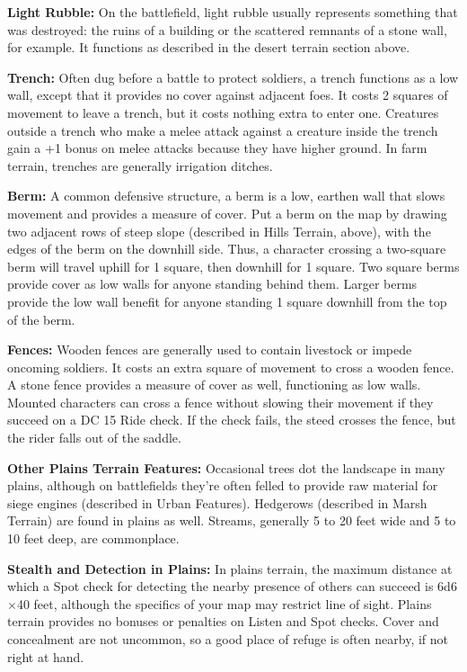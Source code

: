 \documentclass{article}
\begin{document}
\textbf{Light Rubble:} On the battlefield, light rubble usually represents something 
that was destroyed: the ruins of a building or the scattered remnants of a stone 
wall, for example. It functions as described in the desert terrain section above.

\textbf{Trench:} Often dug before a battle to protect soldiers, a trench functions 
as a low wall, except that it provides no cover against adjacent foes. It costs 
2 squares of movement to leave a trench, but it costs nothing extra to enter one. 
Creatures outside a trench who make a melee attack against a creature inside the 
trench gain a +1 bonus on melee attacks because they have higher ground. In farm 
terrain, trenches are generally irrigation ditches.

\textbf{Berm: }A common defensive structure, a berm is a low, earthen wall that 
slows movement and provides a measure of cover. Put a berm on the map by drawing 
two adjacent rows of steep slope (described in Hills Terrain, above), with the 
edges of the berm on the downhill side. Thus, a character crossing a two-square 
berm will travel uphill for 1 square, then downhill for 1 square. Two square berms 
provide cover as low walls for anyone standing behind them. Larger berms provide 
the low wall benefit for anyone standing 1 square downhill from the top of the 
berm. 

\textbf{Fences:} Wooden fences are generally used to contain livestock or impede 
oncoming soldiers. It costs an extra square of movement to cross a wooden fence. 
A stone fence provides a measure of cover as well, functioning as low walls. Mounted 
characters can cross a fence without slowing their movement if they succeed on 
a DC 15 Ride check. If the check fails, the steed crosses the fence, but the rider 
falls out of the saddle.

\textbf{Other Plains Terrain Features:} Occasional trees dot the landscape in many 
plains, although on battlefields they're often felled to provide raw material for 
siege engines (described in Urban Features). Hedgerows (described in Marsh Terrain) 
are found in plains as well. Streams, generally 5 to 20 feet wide and 5 to 10 feet 
deep, are commonplace.

\textbf{Stealth and Detection in Plains:} In plains terrain, the maximum distance 
at which a Spot check for detecting the nearby presence of others can succeed is 
6d6\ensuremath{\times}40 feet, although the specifics of your map may restrict 
line of sight. Plains terrain provides no bonuses or penalties on Listen and Spot 
checks. Cover and concealment are not uncommon, so a good place of refuge is often 
nearby, if not right at hand.
\end{document}
